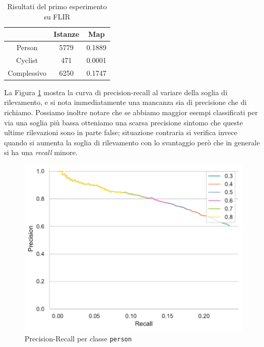 \begin{table}[]
    \centering
    \begin{tabular}{c|c|c|}
    \cline{2-3}
     & Istanze & Map \\ \hline
    \multicolumn{1}{|c|}{Person} & 5779 & 0.1889 \\ \hline
    \multicolumn{1}{|c|}{Cyclist} & 471 & 0.0001 \\ \hline
    \multicolumn{1}{|c|}{Complessivo} & 6250 & 0.1747 \\ \hline
    \end{tabular}
    \caption{Risultati del primo esperimento su FLIR}
    \label{tab:first_experiment_flir}
\end{table}
La Figura \ref{fig:precision_recall_person_1} mostra la curva di precision-recall al variare della soglia di rilevamento, e si nota immediatamente una mancanza sia di precisione che di richiamo. Possiamo inoltre notare che se abbiamo maggior esempi classificati per via una soglia più bassa otteniamo una scarsa precisione sintomo che queste ultime rilevazioni sono in parte false; situazione contraria si verifica invece quando si aumenta la soglia di rilevamento con lo svantaggio però che in generale si ha una \textit{recall} minore.  
\begin{figure}[]
    \centering
    \includegraphics[width=\textwidth]{images/graphic/precision_recall_test_flir_kaist.pdf}
    \caption{Precision-Recall per classe \texttt{person}}
    \label{fig:precision_recall_person_1}
\end{figure}





